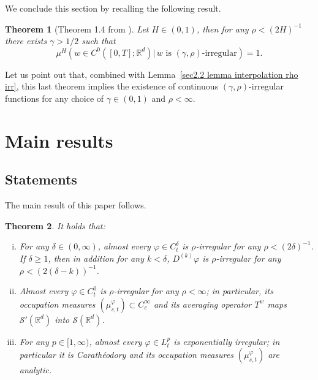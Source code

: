 \documentclass[10pt]{article}
\newenvironment{enumerateroman}{\begin{enumerate}[i.] }{\end{enumerate}}
\newtheorem{theorem}{Theorem}
\begin{document}
We conclude this section by recalling the following result.

\begin{theorem}[Theorem 1.4 from {\cite{catelliergubinelli}}]
  \label{sec2.4 thm catelliergubinelli}Let $H \in (0, 1)$, then for any $\rho
  < (2 H)^{- 1}$ there exists $\gamma > 1 / 2$ such that
  \[ \mu^H \left( w \in C^0 ([0, T] ; \mathbb{R}^d)  \left| \, w \text{ is
     $(\gamma, \rho)$-irregular} \right. \right) = 1. \]
\end{theorem}

Let us point out that, combined with Lemma~\ref{sec2.2 lemma interpolation rho
irr}, this last theorem implies the existence of continuous $(\gamma,
\rho)$\mbox{-}irregular functions for any choice of $\gamma \in (0, 1)$ and
$\rho < \infty$.

\section{Main results}\label{sec3}

\subsection{Statements}\label{sec3.1}

The main result of this paper follows.

\begin{theorem}
  \label{sec3 thm2}It holds that:
  \begin{enumerateroman}
    \item For any $\delta \in (0, \infty)$, almost every $\varphi \in
    C^{\delta}_t$ is $\rho$\mbox{-}irregular for any $\rho < (2 \delta)^{-
    1}$. If $\delta \geqslant 1$, then in addition for any $k < \delta$,
    $D^{(k)} \varphi$ is $\rho$\mbox{-}irregular for any $\rho < (2 (\delta -
    k))^{- 1}$.
    
    \item Almost every $\varphi \in C^0_t$ is $\rho$\mbox{-}irregular for any
    $\rho < \infty$; in particular, its occupation measures
    $(\mu^{\varphi}_{s, t}) \subset C^{\infty}_c$ and its averaging operator
    $T^w$ maps $\mathcal{S}' (\mathbb{R}^d)$ into $\mathcal{S}
    (\mathbb{R}^d)$.
    
    \item For any $p \in [1, \infty)$, almost every $\varphi \in L^p_t$ is
    exponentially irregular; in particular it is Carath{\'e}odory and its
    occupation measures $(\mu^{\varphi}_{s, t})$ are analytic.
  \end{enumerateroman}
\end{theorem}
\end{document}
